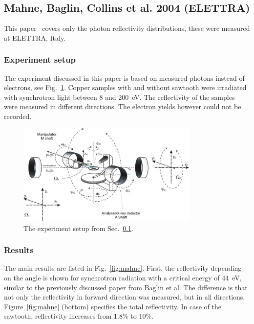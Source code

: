 
\subsection{Mahne, Baglin, Collins et al. 2004 (ELETTRA)}
\label{sec:Mahne}
This paper~\cite{mahne} covers only the photon reflectivity distributions, these were measured at ELETTRA, Italy.

\subsubsection{Experiment setup}
The experiment discussed in this paper is based on measured photons instead of electrons, see Fig.~\ref{fig:exp_mahne}.
Copper samples with and without sawtooth were irradiated with synchrotron light between 8 and 200~eV.
The reflectivity of the samples were measured in different directions.
The electron yields however could not be recorded.

\begin{figure}[tbh]
    \centering
    \includegraphics[width=0.8\textwidth]{../ss/experiment_mahne.png}
    \caption{The experiment setup from Sec.~\ref{sec:Mahne}.}
    \label{fig:exp_mahne}
\end{figure}


\subsubsection{Results}

The main results are listed in Fig.~\ref{fig:mahne}.
First, the reflectivity depending on the angle is shown for synchrotron radiation with a critical energy of 44~eV, similar to the previously discussed paper from Baglin et al.
The difference is that not only the reflectivity in forward direction was measured, but in all directions.
Figure~\ref{fig:mahne} (bottom) specifies the total reflectivity.
In case of the sawtooth, reflectivity increases from 1.8\% to 10\%.

